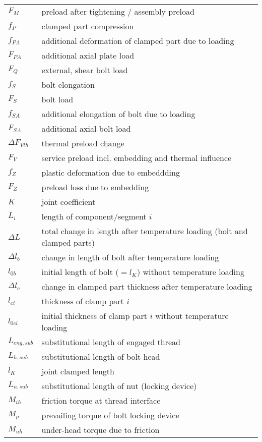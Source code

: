 \begin{longtable}{p{2cm} l}
  $F_M$ & preload after tightening / assembly preload \\
  $f_P$ & clamped part compression \\
  $f_{PA}$ & additional deformation of clamped part due to loading \\
  $F_{PA}$ & additional axial plate load \\
  $F_Q$ & external, shear bolt load \\
  $f_S$ & bolt elongation \\
  $F_S$ & bolt load \\
  $f_{SA}$ & additional elongation of bolt due to loading \\
  $F_{SA}$ & additional axial bolt load \\
  $\Delta F_{Vth}$ & thermal preload change \\
  $F_V$ & service preload incl. embedding and thermal influence \\
  $f_Z$ & plastic deformation due to embeddding \\
  $F_Z$ & preload loss due to embedding \\
  $K$ & joint coefficient \\
  $L_i$ & length of component/segment $i$ \\
  $\Delta L$ & total change in length after temperature loading (bolt and clamped parts) \\
  $\Delta l_b$ & change in length of bolt after temperature loading \\
  $l_{0b}$ & initial length of bolt ($=l_K$) without temperature loading \\
  $\Delta l_c$ & change in clamped part thickness after temperature loading \\
  $l_{ci}$ & thickness of clamp part $i$ \\
  $l_{0ci}$ & initial thickness of clamp part $i$ without temperature loading \\
  $L_{eng,sub}$ & substitutional length of engaged thread \\
  $L_{h,sub}$ & substitutional length of bolt head \\
  $l_K$ & joint clamped length \\
  $L_{n,sub}$ & substitutional length of nut (locking device) \\
  $M_{th}$ & friction torque at thread interface \\
  $M_p$ & prevailing torque of bolt locking device \\
  $M_{uh}$ & under-head torque due to friction \\

\end{longtable}
